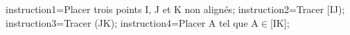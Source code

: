 \documentclass[exercice]{thedocument}%
\begin{document}
%
    \>instruction1={Placer trois points I, J et K non alignés};%
    \>instruction2={Tracer [IJ)};%
    \>instruction3={Tracer (JK)};%
    \>instruction4={Placer A tel que A$\in$[IK]};%
\end{document}
